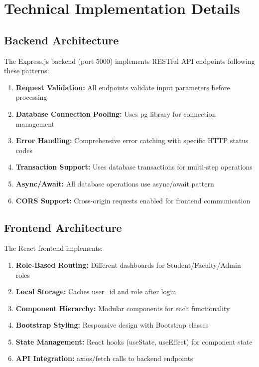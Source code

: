 \documentclass[12pt]{article}
\begin{document}
\newpage

\section{Technical Implementation Details}

\subsection{Backend Architecture}

The Express.js backend (port 5000) implements RESTful API endpoints following these patterns:

\begin{enumerate}
    \item \textbf{Request Validation:} All endpoints validate input parameters before processing
    \item \textbf{Database Connection Pooling:} Uses pg library for connection management
    \item \textbf{Error Handling:} Comprehensive error catching with specific HTTP status codes
    \item \textbf{Transaction Support:} Uses database transactions for multi-step operations
    \item \textbf{Async/Await:} All database operations use async/await pattern
    \item \textbf{CORS Support:} Cross-origin requests enabled for frontend communication
\end{enumerate}

\subsection{Frontend Architecture}

The React frontend implements:

\begin{enumerate}
    \item \textbf{Role-Based Routing:} Different dashboards for Student/Faculty/Admin roles
    \item \textbf{Local Storage:} Caches user\_id and role after login
    \item \textbf{Component Hierarchy:} Modular components for each functionality
    \item \textbf{Bootstrap Styling:} Responsive design with Bootstrap classes
    \item \textbf{State Management:} React hooks (useState, useEffect) for component state
    \item \textbf{API Integration:} axios/fetch calls to backend endpoints
\end{enumerate}
\end{document}
